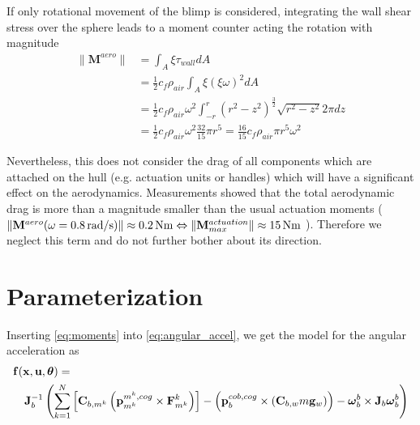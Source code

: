 If only rotational movement of the blimp is considered, integrating the wall shear stress over the sphere leads to a moment counter acting the rotation with magnitude
\begin{align*}
\| \mathbf{M}^{aero} \|
&= \int_A \xi \tau_{wall} dA \\
&= \frac{1}{2} c_f \rho_{air} \int_A \xi (\xi \omega)^2 dA \\
&= \frac{1}{2} c_f \rho_{air} \omega^2 \int_{-r}^{r} (r^2-z^2)^{\frac{3}{2}} \sqrt{r^2-z^2} 2\pi dz \\
&= \frac{1}{2} c_f \rho_{air} \omega^2 \frac{32}{15} \pi r^5
 = \frac{16}{15} c_f \rho_{air} \pi r^5 \omega^2
\end{align*}

Nevertheless, this does not consider the drag of all components which are attached on the hull (e.g. actuation units or handles) which will have a significant effect on the aerodynamics.
Measurements showed that the total aerodynamic drag is more than a magnitude smaller than the usual actuation moments (
$\|\mathbf{M}^{aero}(\omega = \unit[0.8]{rad/s})\| \approx \unit[0.2]{Nm} \Leftrightarrow 
\| \mathbf{M}^{actuation}_{max} \| \approx \unit[15]{Nm}$
). Therefore we neglect this term and do not further bother about its direction.

%
%

\section{Parameterization}
Inserting \cref{eq:moments} into \cref{eq:angular_accel}, we get the model for the angular acceleration as
\begin{align}
\lefteqn{ \mathbf{f}(\mathbf{x}, \mathbf{u}, \boldsymbol{\theta}) = {} \label{eq:sys_mod} }\\
& & {} \mathbf{J}_b^{-1} \left( 
\sum_{k=1}^N  \left[  \mathbf{C}_{b,m^k} \left( \mathbf{p}^{m^k,cog}_{m^k} \times \mathbf{F}^k_{m^k} \right)  \right]
-
\left( \mathbf{p}^{cob,cog}_b \times (\mathbf{C}_{b,w}m\mathbf{g}_w) \right)
- \boldsymbol{\omega}_b^b \times \mathbf{J}_b \boldsymbol{\omega}_b^b \right) \nonumber
\end{align}


